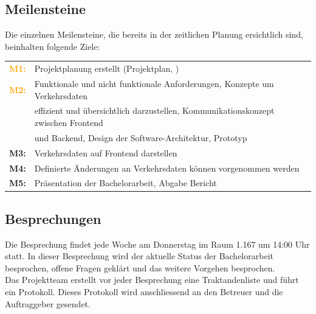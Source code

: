 \documentclass[10pt,a4paper]{article}
\begin{document}
\subsection{Meilensteine}
\begin{flushleft}
	Die einzelnen Meilensteine, die bereits in der zeitlichen Planung ersichtlich sind, beinhalten folgende Ziele:
\end{flushleft}
\begin{tabular}{cl}
	\textcolor{Orange}{\textbf{M1:}} & Projektplanung erstellt (Projektplan, )\\[0.2cm]
	\textcolor{Orange}{\textbf{M2:}} & Funktionale und nicht funktionale Anforderungen, Konzepte um Verkehrsdaten\\[0.1cm]
		& effizient und übersichtlich darzustellen, Kommunikationskonzept zwischen Frontend\\[0.2cm]
		& und Backend, Design der Software-Architektur, Prototyp\\[0.2cm]
	\textcolor{NavyBlue}{\textbf{M3:}} & Verkehrsdaten auf Frontend darstellen\\[0.2cm]
	\textcolor{NavyBlue}{\textbf{M4:}} & Definierte Änderungen an Verkehrsdaten können vorgenommen werden\\[0.2cm]
	\textcolor{Dandelion}{\textbf{M5:}} & Präsentation der Bachelorarbeit, Abgabe Bericht\\
\end{tabular}
\subsection{Besprechungen}
\begin{flushleft}
	Die Besprechung findet jede Woche am Donnerstag im Raum 1.167 um 14:00 Uhr statt. In dieser Besprechung wird der aktuelle Status der Bachelorarbeit besprochen, offene Fragen geklärt und das weitere Vorgehen besprochen.\\
Das Projektteam erstellt vor jeder Besprechung eine Traktandenliste und führt ein Protokoll. Dieses Protokoll wird anschliessend an den Betreuer und die Auftraggeber gesendet.
\end{flushleft}
\end{document}
